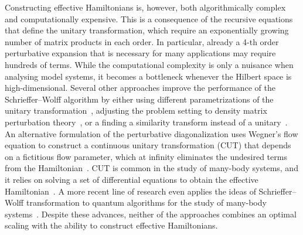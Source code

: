 Constructing effective Hamiltonians is, however, both algorithmically complex and computationally expensive.
This is a consequence of the recursive equations that define the unitary transformation, which require an exponentially growing number of matrix products in each order.
In particular, already a 4-th order perturbative expansion that is necessary for many applications may require hundreds of terms.
While the computational complexity is only a nuisance when analysing model systems, it becomes a bottleneck whenever the Hilbert space is high-dimensional.
Several other approaches improve the performance of the Schrieffer--Wolff algorithm by either using different parametrizations of the unitary transformation~\cite{Van_Vleck_1929, Lowdin_1962, Shavitt_1980, Klein_1974, Suzuki_1983}, adjusting the problem setting to density matrix perturbation theory~\cite{McWeeny_1962, Truflandier_2020}, or a finding a similarity transform instead of a unitary~\cite{Bloch_1958}.
An alternative formulation of the perturbative diagonalization uses Wegner's flow equation to construct a continuous unitary transformation (CUT) that depends on a fictitious flow parameter, which at infinity eliminates the undesired terms from the Hamiltonian~\cite{Wegner_1994, cutpapers...}.
CUT is common in the study of many-body systems, and it relies on solving a set of differential equations to obtain the effective Hamiltonian~\cite{add stuff}.
A more recent line of research even applies the ideas of Schrieffer--Wolff transformation to quantum algorithms for the study of many-body systems~\cite{Wurtz_2020, Zhang_2022}.
Despite these advances, neither of the approaches combines an optimal scaling with the ability to construct effective Hamiltonians.

